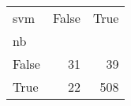 \begin{tabular}{lrr}
\toprule
svm &  False &  True  \\
nb    &        &        \\
\midrule
False &     31 &     39 \\
True  &     22 &    508 \\
\bottomrule
\end{tabular}
